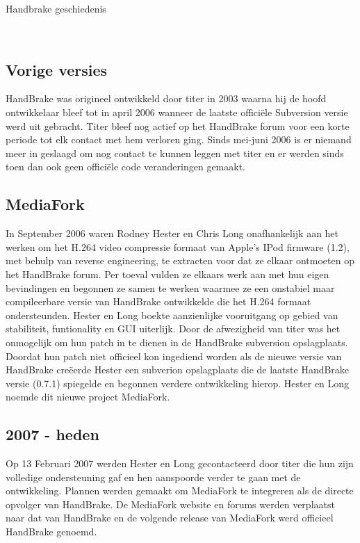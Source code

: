 \label{Hoofdstuk 2}

\begin{sectionbox}{Handbrake geschiedenis}\end{sectionbox}
\ \\[12pt]
\subsection{Vorige versies}

HandBrake was origineel ontwikkeld door titer in 2003 waarna hij de hoofd ontwikkelaar bleef tot in april 2006 wanneer de laatste officiële Subversion versie werd uit gebracht. Titer bleef nog actief op het HandBrake forum voor een korte periode tot elk contact met hem verloren ging. Sinds mei-juni 2006 is er niemand meer in geslaagd om nog contact te kunnen leggen met titer en er werden sinds toen dan ook geen officiële code veranderingen gemaakt.

\subsection{MediaFork}

In September 2006 waren Rodney Hester en Chris Long onafhankelijk aan het werken om het H.264 video compressie formaat van Apple's IPod firmware (1.2), met behulp van reverse engineering, te extracten voor dat ze elkaar ontmoeten op het HandBrake forum. Per toeval vulden ze elkaars werk aan met hun eigen bevindingen en begonnen ze samen te werken waarmee ze een onstabiel maar compileerbare versie van HandBrake ontwikkelde die het H.264 formaat ondersteunden. Hester en Long boekte aanzienlijke vooruitgang op gebied van stabiliteit, funtionality en GUI uiterlijk. Door de afwezigheid van titer was het onmogelijk om hun patch in te dienen in de HandBrake subversion opslagplaats.\\

Doordat hun patch niet officieel kon ingediend worden als de nieuwe versie van HandBrake creëerde Hester een subverion opslagplaats die de laatste HandBrake versie (0.7.1) spiegelde en begonnen verdere ontwikkeling hierop. Hester en Long noemde dit nieuwe project MediaFork.

\subsection{2007 - heden}

Op 13 Februari 2007 werden Hester en Long gecontacteerd door titer die hun zijn volledige ondersteuning gaf en hen aanspoorde verder te gaan met de ontwikkeling. Plannen werden gemaakt om MediaFork te integreren als de directe opvolger van HandBrake. De MediaFork website en forums werden verplaatst naar dat van HandBrake en de volgende release van MediaFork werd officieel HandBrake genoemd.\\[24pt]

